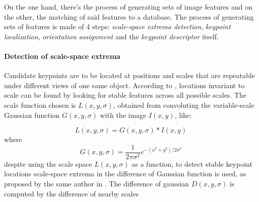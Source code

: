 \documentclass[../main.tex]{subfiles}
\begin{document}
On the one hand, there's the process of generating sets of image features and on the other, the matching of said features to a database. The process of generating sets of features is made of 4 steps: \emph{scale-space extrema detection}, \emph{keypoint localization}, \emph{orientation assignment} and the \emph{keypoint descriptor} itself.

\paragraph{Detection of scale-space extrema}
Candidate keypoints are to be located at positions and scales that are repeatable under different views of one same object. According to \cite{SIFTlowe2004}, locations invariant to scale can be found by looking for stable features across all possible scales. The scale function chosen is $L(x,y,\sigma)$, obtained from convoluting the variable-scale Gaussian function $G(x,y,\sigma)$ with the image $I(x,y)$, like:

\begin{equation}
    L(x, y, \sigma)=G(x, y, \sigma) * I(x, y)
\end{equation}
where
\begin{equation}
    G(x, y, \sigma)=\frac{1}{2 \pi \sigma^{2}} e^{-\left(x^{2}+y^{2}\right) / 2 \sigma^{2}}
\end{equation}
despite using the scale space $L(x,y,\sigma)$ as a function, to detect stable keypoint locations scale-space extrema in the difference of Gaussian function is used, as proposed by the same author in \cite{Lowe1999}. The difference of gaussian $D(x,y,\sigma)$ is computed by the difference of nearby scales
\end{document}
